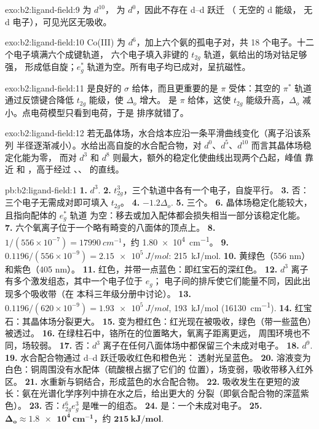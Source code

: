 \begin{solution}{exo:b2:ligand-field:9}
 为 $d^{10}$， 为 $d^0$，因此不存在 d–d 跃迁
（ 无空的 d 能级， 无 d 电子），可见光区无吸收。
\end{solution}

\begin{solution}{exo:b2:ligand-field:10}
Co(III) 为 $d^6$，加上六个氨的孤电子对，共 18 个电子。十二个电子填满六个成键轨道，
六个电子填入非键的 $t_{2g}$ 轨道，氨给出的场对钴足够强，
形成低自旋；$e_g^*$ 轨道为空。所有电子均已成对，呈抗磁性。
\end{solution}

\begin{solution}{exo:b2:ligand-field:11}
 是良好的 $\sigma$ 给体，而且更重要的是 $\pi$ 受体：其空的 $\pi^*$ 轨道
通过反馈键合降低 $t_{2g}$ 能级，使 $\Delta_o$ 增大。 是 $\pi$ 给体，这使
$t_{2g}$ 能级升高，$\Delta_o$ 减小。点电荷模型只看到电荷，于是
排序就错了。
\end{solution}

\begin{solution}{exo:b2:ligand-field:12}
若无晶体场，水合焓本应沿一条平滑曲线变化（离子沿该系列
半径逐渐减小）。水给出高自旋的水合配合物，对 $d^0$、$d^5$、$d^{10}$ 而言其晶体场稳定化能为零，
而对 $d^3$ 和 $d^8$ 则最大，额外的稳定化使曲线出现两个凸起，峰值
靠近  和 ，高于经过 、、 的直线。
\end{solution}

\begin{solution}{pb:b2:ligand-field:1}
\textbf{1.} $d^3$.
\textbf{2.} $t_{2g}^3$，三个轨道中各有一个电子，自旋平行。
\textbf{3.} 否：三个电子无需成对即可填入 $t_{2g}$。
\textbf{4.} $-1.2\Delta_o$.
\textbf{5.} 三个。
\textbf{6.} 晶体场稳定化能较大，且指向配体的 $e_g^*$ 轨道
为空：移去或加入配体都会损失相当一部分该稳定化能。
\textbf{7.} 六个氧离子位于一个略有畸变的八面体的顶点上。
\textbf{8.} $1/(556 \times 10^{-7}) = \qty{17990}{cm^{-1}}$，约 \qty{1.80e4}{cm^{-1}}。
\textbf{9.} $0.1196/(556 \times 10^{-9}) = \qty{2.15e5}{J/mol}$: \qty{215}{kJ/mol}.
\textbf{10.} 黄绿色（556 nm）和紫色（405 nm）。
\textbf{11.} 红色，并带一点蓝色：即红宝石的深红色。
\textbf{12.} $d^3$ 离子有多个激发组态，其中一个电子位于 $e_g$；
电子间的排斥使它们能量不同，因此出现多个吸收带（在
本科三年级分册中讨论）。
\textbf{13.} $0.1196/(620 \times 10^{-9}) = \qty{1.93e5}{J/mol}$, \qty{193}{kJ/mol}
(\qty{16130}{cm^{-1}}).
\textbf{14.} 红宝石：其晶体场分裂更大。
\textbf{15.} 变为橙红色：红光现在被吸收，绿色（带一些蓝色）被透过。
\textbf{16.} 在绿柱石中，铬所在的位置略大，氧离子距离更远，
周围环境也不同，场较弱。
\textbf{17.} 否：$d^3$ 离子在任何八面体场中都保留三个未成对电子。
\textbf{18.} $d^9$.
\textbf{19.} 水合配合物通过 d–d 跃迁吸收红色和橙色光：
透射光呈蓝色。
\textbf{20.} 溶液变为白色：铜周围没有水配体（硫酸根占据了它们的
位置），场变弱，吸收带移入红外区。
\textbf{21.} 水重新与铜结合，形成蓝色的水合配合物。
\textbf{22.} 吸收发生在更短的波长：氨在光谱化学序列中排在水之后，给出更大的
分裂（即氨合配合物的深蓝紫色）。
\textbf{23.} 否：$t_{2g}^6e_g^3$ 是唯一的组态。
\textbf{24.} 是：一个未成对电子。
\textbf{25.} $\boldsymbol{\Delta_o \approx \qty{1.8e4}{cm^{-1}}}$，约
$\boldsymbol{\qty{215}{kJ/mol}}$.
\end{solution}
